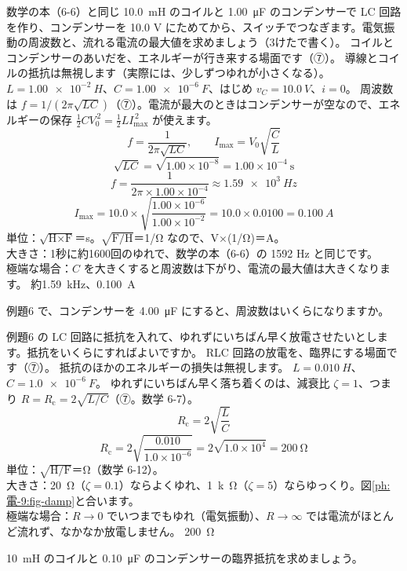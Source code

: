 \label{ph:電-9:ex6}
\begin{phreidai}
数学の本（6-6）と同じ \qty{10.0}{mH} のコイルと \qty{1.00}{\micro F} のコンデンサーで LC 回路を作り、コンデンサーを 10.0 V にためてから、スイッチでつなぎます。電気振動の周波数と、流れる電流の最大値を求めましょう（3けたで書く）。
\phbamen
コイルとコンデンサーのあいだを、エネルギーが行き来する場面です（⑦）。
\phmushi
導線とコイルの抵抗は無視します（実際には、少しずつゆれが小さくなる）。
\phzu
$L=\qty{1.00e-2}{H}$、$C=\qty{1.00e-6}{F}$、はじめ $v_C=\qty{10.0}{V}$、$i=0$。
\phriyu
周波数は $f=1/(2\pi\sqrt{LC})$（⑦）。電流が最大のときはコンデンサーが空なので、エネルギーの保存 $\tfrac12CV_0^{\,2}=\tfrac12LI_{\max}^{\,2}$ が使えます。
\phtateru
\[ f=\frac{1}{2\pi\sqrt{LC}},\qquad I_{\max}=V_0\sqrt{\frac{C}{L}} \]
\phtoku
\[ \sqrt{LC}=\sqrt{1.00\times10^{-8}}=1.00\times10^{-4}\ \mathrm{s} \]
\[ f=\frac{1}{2\pi\times1.00\times10^{-4}}\approx\qty{1.59e3}{Hz} \]
\[ I_{\max}=10.0\times\sqrt{\frac{1.00\times10^{-6}}{1.00\times10^{-2}}}=10.0\times0.0100=\qty{0.100}{A} \]
\phtashikame
単位：$\sqrt{\text{H×F}}$＝s。$\sqrt{\text{F/H}}$＝1/Ω なので、V×(1/Ω)＝A。\\
大きさ：1秒に約1600回のゆれで、数学の本（6-6）の 1592 Hz と同じです。\\
極端な場合：$C$ を大きくすると周波数は下がり、電流の最大値は大きくなります。
\kotae 約\qty{1.59}{kHz}、\qty{0.100}{A}
\end{phreidai}
\begin{jibun}
例題6 で、コンデンサーを \qty{4.00}{\micro F} にすると、周波数はいくらになりますか。
\end{jibun}

\label{ph:電-9:ex7}
\begin{phreidai}[ゆれずに止める抵抗]
例題6 の LC 回路に抵抗を入れて、ゆれずにいちばん早く放電させたいとします。抵抗をいくらにすればよいですか。
\phbamen
RLC 回路の放電を、臨界にする場面です（⑦）。
\phmushi
抵抗のほかのエネルギーの損失は無視します。
\phzu
$L=\qty{0.010}{H}$、$C=\qty{1.0e-6}{F}$。
\phriyu
ゆれずにいちばん早く落ち着くのは、減衰比 $\zeta=1$、つまり $R=R_{\mathrm c}=2\sqrt{L/C}$（⑦。数学 6-7）。
\phtateru
\[ R_{\mathrm c}=2\sqrt{\frac{L}{C}} \]
\phtoku
\[ R_{\mathrm c}=2\sqrt{\frac{0.010}{1.0\times10^{-6}}}=2\sqrt{1.0\times10^4}=\qty{200}{\ohm} \]
\phtashikame
単位：$\sqrt{\text{H/F}}$＝Ω（数学 6-12）。\\
大きさ：\qty{20}{\ohm}（$\zeta=0.1$）ならよくゆれ、\qty{1}{k\ohm}（$\zeta=5$）ならゆっくり。図\ref{ph:電-9:fig-damp}と合います。\\
極端な場合：$R\to0$ でいつまでもゆれ（電気振動）、$R\to\infty$ では電流がほとんど流れず、なかなか放電しません。
\kotae \qty{200}{\ohm}
\end{phreidai}
\begin{jibun}
\qty{10}{mH} のコイルと \qty{0.10}{\micro F} のコンデンサーの臨界抵抗を求めましょう。
\end{jibun}

